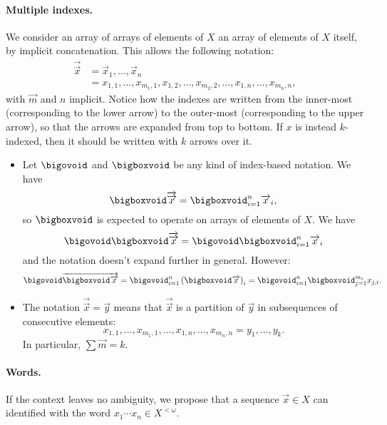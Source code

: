 \documentclass[a4paper, 8pt]{article}
\begin{document}
\begin{multicols}{2}
\paragraph{Multiple indexes.} We consider an array of arrays of elements of $X$ an array of elements of $X$ itself, by implicit concatenation. This allows the following notation:
\begin{align*}
	\overrightarrow{\overrightarrow{x}} &= \overrightarrow{x}_1, \ldots, \overrightarrow{x}_n \\
	&= x_{1, 1}, \ldots, x_{m_1, 1}, x_{1, 2}, \ldots, x_{m_2, 2}, \ldots, x_{1, n}, \ldots, x_{m_n, n} ,
\end{align*}
with $\overrightarrow{m}$ and $n$ implicit. Notice how the indexes are written from the inner-most (corresponding to the lower arrow) to the outer-most (corresponding to the upper arrow), so that the arrows are expanded from top to bottom. If $x$ is instead $k$-indexed, then it should be written with $k$ arrows over it. 

\begin{examples*}
	\begin{itemize}
		\item Let $\bigovoid$ and $\bigboxvoid$ be any kind of index-based notation. We have
			\[ \bigboxvoid \overrightarrow{\overrightarrow{x}} = \bigboxvoid_{i = 1}^n \overrightarrow{x}_i , \]
			so $\bigboxvoid$ is expected to operate on arrays of elements of $X$. We have
			\[ \bigovoid \bigboxvoid \overrightarrow{\overrightarrow{x}} = \bigovoid \bigboxvoid_{i = 1}^n \overrightarrow{x}_i \]
			and the notation doesn't expand further in general. However:
			\[ \bigovoid \overrightarrow{\bigboxvoid \overrightarrow{x}} = \bigovoid_{i = 1}^n \left( \bigboxvoid \overrightarrow{x} \right)_i = \bigovoid_{i = 1}^n \bigboxvoid_{j = 1}^{m_i} x_{j, i} . \]
		\item The notation $\overrightarrow{\overrightarrow{x}} = \overrightarrow{y}$ means that $\overrightarrow{\overrightarrow{x}}$ is a partition of $\overrightarrow{y}$ in subsequences of consecutive elements:
			\[ x_{1, 1}, \ldots, x_{m_1, 1}, \ldots, x_{1, n}, \ldots, x_{m_n, n} = y_1, \ldots, y_k . \]
			In particular, $\sum \overrightarrow{m} = k$.
	\end{itemize}
\end{examples*}

\paragraph{Words.} If the context leaves no ambiguity, we propose that a sequence $\overrightarrow{x} \in X$ can identified with the word $x_1 \cdots x_n \in X^{< \omega}$.


\end{multicols}
\end{document}
